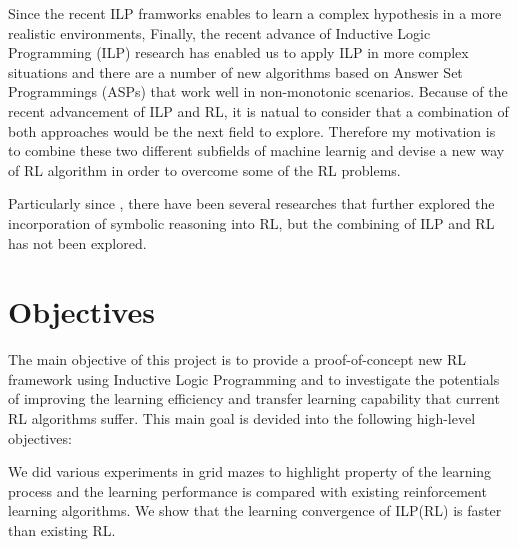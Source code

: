 Since the recent ILP framworks enables to learn a complex hypothesis in a more realistic environments, 
Finally, the recent advance of Inductive Logic Programming (ILP) research has enabled us to apply ILP in more complex situations and there are a number of new algorithms based on Answer Set Programmings (ASPs) that work well in non-monotonic scenarios.
Because of the recent advancement of ILP and RL, it is natual to consider that a combination of both approaches would be the next field to explore.
Therefore my motivation is to combine these two different subfields of machine learnig and devise a new way of RL algorithm in order to overcome some of the RL problems.

Particularly since \cite{Garnelo2016}, there have been several researches that further explored the incorporation of symbolic reasoning into RL, but the combining of ILP and RL has not been explored. 

\section{Objectives}
\label{sec:objectives}

The main objective of this project is to provide a proof-of-concept new RL framework using Inductive Logic Programming and to investigate the potentials of improving the learning efficiency and transfer learning capability that current RL algorithms suffer.
This main goal is devided into the following high-level objectives:


We did various experiments in grid mazes to highlight property of the learning process and the learning performance is compared with existing reinforcement learning algorithms.
We show that the learning convergence of ILP(RL) is faster than existing RL. 

